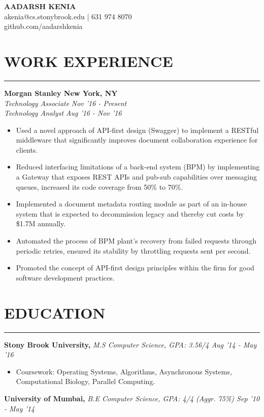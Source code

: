 \documentclass[12pt]{article}
\newcommand{\sectionHeading}[1]{
\section*{\small{#1}}
\vspace{-10pt}
\hrule
\vspace{8pt}
}
\newcommand{\experienceSectionSubheading}[6]{
  \vspace{-1pt}
    \small{\textbf{Morgan Stanley \hfill New York, NY}} \\
    \small{\textit{#3} \hfill \textit{#4}} \\
    \small{\textit{#5} \hfill \textit{#6}} \\
    \vspace{-15pt}
}
\newcommand{\educationSectionSubheading}[3]{
    \noindent \small{\textbf{#1, }\textit{#2 \hfill #3}}\\ \vspace{-18pt}
}
\newcommand{\sectionListStart}{
    \begin{itemize}[label={\small{\textbullet}}, leftmargin=20pt] %
}
\newcommand{\sectionListEnd}{\end{itemize}}
\newcommand{\sectionListItem}[1]{\item \small{#1}}
\begin{document}
\begin{center}
\LARGE{\textbf{AADARSH KENIA}}\\
\vspace{4pt}
\small{\Letter \hspace{2mm}akenia@cs.stonybrook.edu} | \Telefon \hspace{2mm}631 974 8070 \\
\vspace{2pt}
\small{github.com/aadarshkenia}
\end{center}

\sectionHeading{WORK EXPERIENCE}
\experienceSectionSubheading
{Morgan Stanley}{New York, NY}
{Technology Associate}{Nov '16 - Present}
{Technology Analyst}{Aug '16 - Nov '16}
\sectionListStart
    \sectionListItem
        Used a novel approach of API-first design (Swagger) to implement a RESTful middleware that significantly improves document collaboration experience for clients.

    \sectionListItem
        Reduced interfacing limitations of a back-end system (BPM) by implementing a Gateway that exposes REST APIs and pub-sub capabilities over messaging queues, increased its code coverage from 50\% to 70\%.

    \sectionListItem
        Implemented a document metadata routing module as part of an in-house system that is expected to decommission legacy and thereby cut costs by \$1.7M annually.
        
    \sectionListItem
        Automated the process of BPM plant's recovery from failed requests through periodic retries, ensured its stability by throttling requests sent per second. 
        
    \sectionListItem
        Promoted the concept of API-first design principles within the firm for good software development practices.
        
\sectionListEnd


\sectionHeading{EDUCATION}
\educationSectionSubheading
{Stony Brook  University}{M.S Computer Science, GPA: 3.56/4}{Aug '14 - May '16}
\sectionListStart
    \sectionListItem
        Coursework: Operating Systems, Algorithms, Asynchronous Systems, Computational Biology, Parallel Computing. 
\sectionListEnd

\educationSectionSubheading
{University of Mumbai}{B.E Computer Science, GPA: 4/4 (Aggr. 75\%)}{Sep '10 - May '14}
\end{document}
